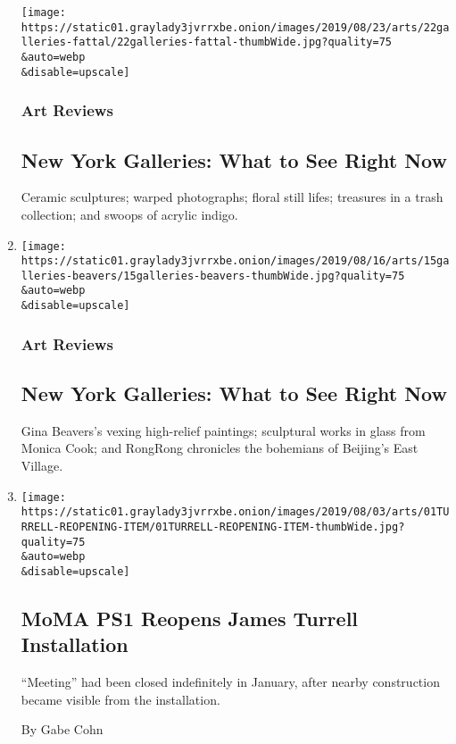 \begin{enumerate}
  \texttt{[image: https://static01.graylady3jvrrxbe.onion/images/2019/08/23/arts/22galleries-fattal/22galleries-fattal-thumbWide.jpg?quality=75\\\&auto=webp\\\&disable=upscale]}

  \hypertarget{art-reviews}{%
  \subsubsection{Art Reviews}\label{art-reviews}}

  \hypertarget{new-york-galleries-what-to-see-right-now}{%
  \subsection{New York Galleries: What to See Right
  Now}\label{new-york-galleries-what-to-see-right-now}}

  Ceramic sculptures; warped photographs; floral still lifes; treasures
  in a trash collection; and swoops of acrylic indigo.
\item
  \href{/2019/08/14/arts/design/new-york-galleries-what-to-see-right-now.html}{}

  \texttt{[image: https://static01.graylady3jvrrxbe.onion/images/2019/08/16/arts/15galleries-beavers/15galleries-beavers-thumbWide.jpg?quality=75\\\&auto=webp\\\&disable=upscale]}

  \hypertarget{art-reviews-1}{%
  \subsubsection{Art Reviews}\label{art-reviews-1}}

  \hypertarget{new-york-galleries-what-to-see-right-now-1}{%
  \subsection{New York Galleries: What to See Right
  Now}\label{new-york-galleries-what-to-see-right-now-1}}

  Gina Beavers's vexing high-relief paintings; sculptural works in glass
  from Monica Cook; and RongRong chronicles the bohemians of Beijing's
  East Village.
\item
  \href{/2019/08/01/arts/design/moma-ps1-reopens-james-turrell-installation.html}{}

  \texttt{[image: https://static01.graylady3jvrrxbe.onion/images/2019/08/03/arts/01TURRELL-REOPENING-ITEM/01TURRELL-REOPENING-ITEM-thumbWide.jpg?quality=75\\\&auto=webp\\\&disable=upscale]}

  \hypertarget{moma-ps1-reopens-james-turrell-installation}{%
  \subsection{MoMA PS1 Reopens James Turrell
  Installation}\label{moma-ps1-reopens-james-turrell-installation}}

  ``Meeting'' had been closed indefinitely in January, after nearby
  construction became visible from the installation.

  By Gabe Cohn
\end{enumerate}

